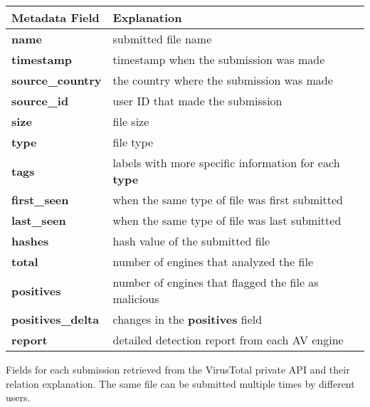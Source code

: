 \begin{table}[h!]
\centering
\footnotesize
{
\begin{tabular}{l|l}
\hline
Metadata Field & Explanation \\
\hline                            
{\bf name}      & submitted file name \\
{\bf timestamp} & timestamp when the submission was made \\
{\bf source\_country} & the country where the submission was made \\
{\bf source\_id} & user ID that made the submission\\
{\bf size} & file size \\
{\bf type} & file type \\
{\bf tags} & labels with more specific information for each {\bf type}\\
{\bf first\_seen} & when the same type of file was first submitted \\
{\bf last\_seen} & when the same type of file was last submitted \\
{\bf hashes} & hash value of the submitted file\\
{\bf total} & number of engines that analyzed the file \\
{\bf positives} & number of engines that flagged the file as malicious \\
{\bf positives\_delta} & changes in the {\bf positives} field \\
{\bf report} & detailed detection report from each AV engine \\
\hline

\end{tabular}
}
{ 
Fields for each submission retrieved from the VirusTotal private API and their relation explanation.
The same file can be submitted multiple times by different users.
}
\end{table}


